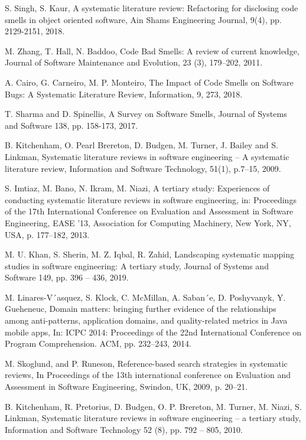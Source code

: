 \documentclass{sigchi}
\begin{document}
\begin{thebibliography}{2}
	S. Singh, S. Kaur, A systematic literature review: Refactoring for disclosing code smells in object oriented software, Ain Shams Engineering Journal, 9(4), pp. 2129-2151, 2018.
	
	 M. Zhang, T. Hall, N. Baddoo, Code Bad Smells: A review of current knowledge, Journal of Software Maintenance and Evolution, 23 (3), 179–202, 2011.
	
		A. Cairo, G. Carneiro, M. P. Monteiro, The Impact of Code Smells on Software Bugs: A Systematic Literature Review, Information, 9, 273, 2018.
	
	 T. Sharma and D. Spinellis, A Survey on Software Smells, Journal of Systems and Software 138, pp. 158-173, 2017.
	
	 B. Kitchenham, O. Pearl Brereton, D. Budgen, M. Turner, J. Bailey and S. Linkman, Systematic literature reviews in software engineering – A systematic literature review, Information and Software Technology, 51(1), p.7–15, 2009.
	
	 S. Imtiaz, M. Bano, N. Ikram, M. Niazi, A tertiary study: Experiences of conducting systematic literature reviews in software engineering, in: Proceedings of the 17th International Conference on Evaluation and Assessment in Software Engineering, EASE ’13, Association for Computing Machinery, New York, NY, USA, p. 177–182, 2013.
	
	 M. U. Khan, S. Sherin, M. Z. Iqbal, R. Zahid, Landscaping systematic mapping studies in software engineering: A tertiary study, Journal of Systems and Software 149, pp. 396 – 436, 2019.
	
	 M. Linares-V´asquez, S. Klock, C. McMillan, A. Saban´e, D. Poshyvanyk, Y. Gueheneuc, Domain matters: bringing further evidence of the relationships among anti-patterns, application domains, and quality-related metrics in Java mobile apps, In: ICPC 2014: Proceedings of the 22nd International Conference on Program Comprehension. ACM, pp. 232–243, 2014.
	
	 M. Skoglund, and P. Runeson, Reference-based search strategies in systematic reviews, In Proceedings of the 13th international conference on Evaluation and Assessment in Software Engineering, Swindon, UK, 2009, p. 20–21. 
	
	 B. Kitchenham, R. Pretorius, D. Budgen, O. P. Brereton, M. Turner, M. Niazi, S. Linkman, Systematic literature reviews in software engineering – a tertiary study, Information and Software Technology 52 (8), pp. 792 – 805, 2010. 
	

\end{thebibliography}
\end{document}
